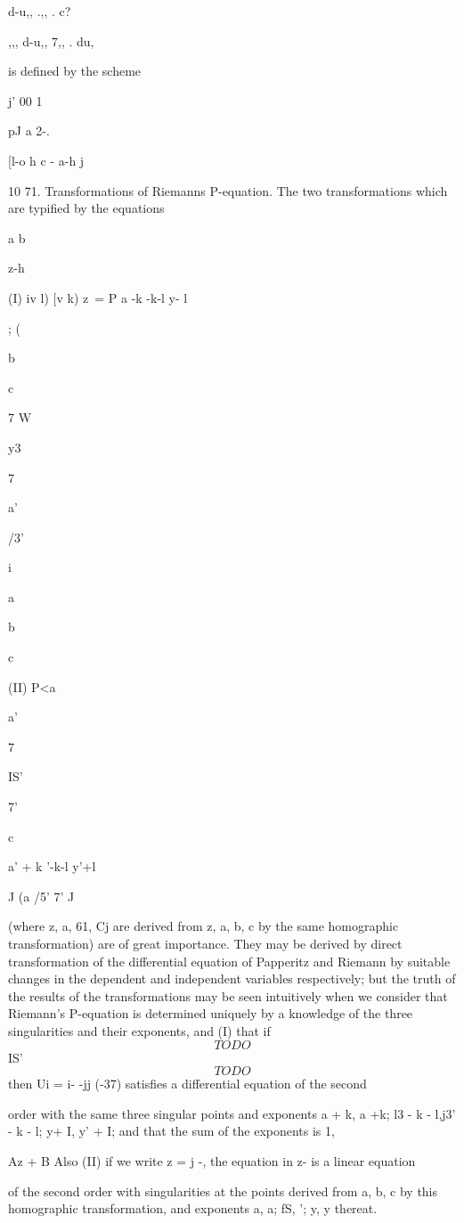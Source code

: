 d-u,, .,, . c?

,,, d-u,, 7,, . du,

is defined by the scheme

j' 00 1 \

pJ a 2-.

[l-o h c - a-h j

10 71. Transformations of Riemanns P-equation. The two transformations
which are typified by the equations

a b

z-h

(I) iv l) [v k) z\ = P a -k -k-l y- l

; (

b

c

7 W

y3

7

a'

/3'

i

a

b

c

(II) P<a

a'



7

IS'

7'

c

a' + k '-k-l y'+l

J (a /5' 7' J

(where z, a, 61, Cj are derived from z, a, b, c by the same
homographic transformation) are of great importance. They may be
derived by direct transformation of the differential equation of
Papperitz and Riemann by suitable changes in the dependent and
independent variables respectively; but the truth of the results of
the transformations may be seen intuitively when we consider that
Riemann's P-equation is determined uniquely by a knowledge of the
three singularities and their exponents, and (I) that if
$$
TODO
$$
IS'
$$
TODO
$$
then Ui = i- -jj (-37) satisfies a differential equation of the second

order with the same three singular points and exponents a + k, a +k;
l3 - k - l,j3' - k - l; y+ I, y' + I; and that the sum of the
exponents is 1,

Az + B Also (II) if we write z = j -, the equation in z- is a linear
equation

of the second order with singularities at the points derived from a,
b, c by this homographic transformation, and exponents a, a; fS, ';
y, y thereat.

